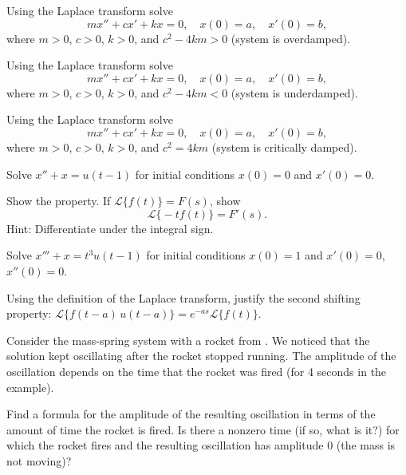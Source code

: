 \begin{exercise}
Using the Laplace transform solve
\begin{equation*}
m x'' + c x' + k x = 0 , \quad x(0) = a, \quad x'(0) = b ,
\end{equation*}
where $m > 0$, $c > 0$, $k > 0$, and
$c^2 - 4km > 0$ (system is overdamped).
\end{exercise}

\begin{exercise}
Using the Laplace transform solve
\begin{equation*}
m x'' + c x' + k x = 0 , \quad x(0) = a, \quad x'(0) = b ,
\end{equation*}
where $m > 0$, $c > 0$, $k > 0$, and
$c^2 - 4km < 0$ (system is underdamped).
\end{exercise}

\begin{exercise}
Using the Laplace transform solve
\begin{equation*}
m x'' + c x' + k x = 0 , \quad x(0) = a, \quad x'(0) = b ,
\end{equation*}
where $m > 0$, $c > 0$, $k > 0$, and
$c^2 = 4km$ (system is critically damped).
\end{exercise}

\begin{exercise}
Solve $x'' + x = u(t-1)$ for initial conditions $x(0) = 0$ and $x'(0) = 0$.
\end{exercise}

\begin{exercise}
Show the  property.  If
$\mathcal{L} \bigl\{ f(t) \bigr\} = F(s)$, show
\begin{equation*}
\mathcal{L} \bigl\{ -t f(t) \bigr\} = F'(s) .
\end{equation*}
Hint: Differentiate under the integral sign.
\end{exercise}

\begin{exercise}
Solve $x''' + x = t^3 u(t-1)$ for initial conditions $x(0) = 1$ and $x'(0) =
0$, $x''(0) = 0$.
\end{exercise}

\begin{exercise}
Using the definition of the Laplace transform,
justify the second shifting property: 
$\mathcal{L} \bigl\{ f(t-a) \, u(t-a) \bigr\}
= e^{-as} \mathcal{L} \bigl\{ f(t) \bigr\}$.
\end{exercise}

\begin{exercise}
Consider the mass-spring system with a rocket from
.  We noticed that the solution kept oscillating
after the rocket stopped running.  The amplitude of the oscillation depends
on the time that the rocket was fired (for 4 seconds in the example).
\begin{tasks}
\task
Find a formula for the amplitude of the resulting oscillation
in terms of the amount of time the rocket is fired.
\task
 Is there
a nonzero time (if so, what is it?)
for which the rocket fires and the resulting oscillation
has amplitude 0 (the mass is not moving)?
\end{tasks}
\end{exercise}

